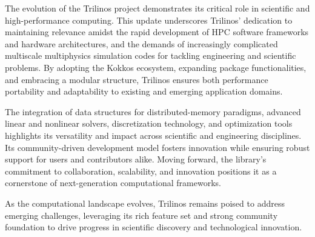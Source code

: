 
The evolution of the Trilinos project demonstrates its critical role in scientific and high-performance computing.
This update underscores Trilinos' dedication to maintaining relevance amidst the rapid development of HPC software frameworks and hardware architectures, and the demands of increasingly complicated multiscale multiphysics simulation codes for tackling engineering and scientific problems.
By adopting the Kokkos ecosystem, expanding package functionalities, and embracing a modular structure,
Trilinos ensures both performance portability and adaptability to existing and emerging application domains.

The integration of data structures for distributed-memory paradigms, advanced linear and nonlinear solvers, discretization technology, and optimization tools highlights its versatility and impact across scientific and engineering disciplines.
Its community-driven development model fosters innovation while ensuring robust support for users and contributors alike.
Moving forward, the library's commitment to collaboration, scalability, and innovation positions it as a cornerstone of next-generation computational frameworks.

As the computational landscape evolves, Trilinos remains poised to address emerging challenges, leveraging its rich feature set and strong community foundation to drive progress in scientific discovery and technological innovation.